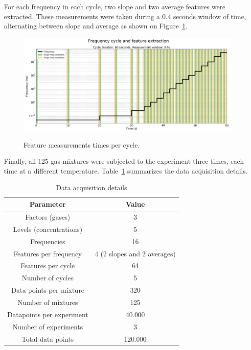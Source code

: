 For each frequency in each cycle, two slope and two average features were extracted. These measurements were taken during a 0.4 seconds window of time, alternating between slope and average as shown on Figure~\ref{fig:feat-window}. 

\begin{figure}[!htb]
	\centering
	\includegraphics[width=1\textwidth]{../figures/measurement-windows.png}
	\label{fig:feat-window}
	\caption{Feature measurements times per cycle.}
\end{figure} 

Finally, all 125 gas mixtures were subjected to the experiment three times, each time at a different temperature. Table~\ref{tab:measurements} summarizes the data acquisition details.

\begin{table}[h]
	\centering
	\caption{Data acquisition details}
	\label{tab:measurements}
	\begin{tabular}{|c|c|}
		\hline
		\textbf{Parameter} & \textbf{Value} \\
		\hline
		Factors (gases) & 3 \\
		\hline
		Levels (concentrations) & 5 \\
		\hline
		Frequencies & 16 \\
		\hline
		Features per frequency & 4 (2 slopes and 2 averages) \\
		\hline
		Features per cycle & 64 \\
		\hline
		Number of cycles & 5 \\
		\hline
		Data points per mixture & 320 \\
		\hline
		Number of mixtures & 125 \\
		\hline
		Datapoints per experiment & 40.000 \\
		\hline
		Number of experiments & 3 \\
		\hline
		Total data points & 120.000 \\
		\hline
	\end{tabular}
\end{table}

